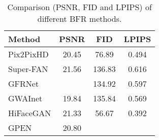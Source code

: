 \documentclass[final]{cvpr}
\begin{document}
\begin{table}[t!]
    \centering
    \caption{Comparison (PSNR, FID and LPIPS) of different BFR methods. \protect\footnotemark}
    \vspace*{-3mm}
    \label{tab:restore}
\begin{tabular}{l|c c c}
      \textbf{Method} & \textbf{PSNR} & \textbf{FID} & \textbf{LPIPS} \\
      \hline
      Pix2PixHD \protect{\cite{Wang2018Pix2PixHD}} & 20.45 & 76.89 & 0.494 \\
      Super-FAN \protect{\cite{Bulat2018SuperFAN}} & 21.56 & 136.83 & 0.616 \\
GFRNet \protect{\cite{Li2018GFRNet}} &  & 134.92 & 0.597 \\
      GWAInet \protect{\cite{Dogan2019Exemplar}} & 19.84 & 135.84 & 0.569 \\
HiFaceGAN \protect{\cite{Yang2020HiFaceGANFR}} & 21.33 & 56.67 & 0.392 \\
      GPEN & 20.80 &  &  \\
   \end{tabular}
\vspace*{-5mm}
\end{table}
\end{document}
